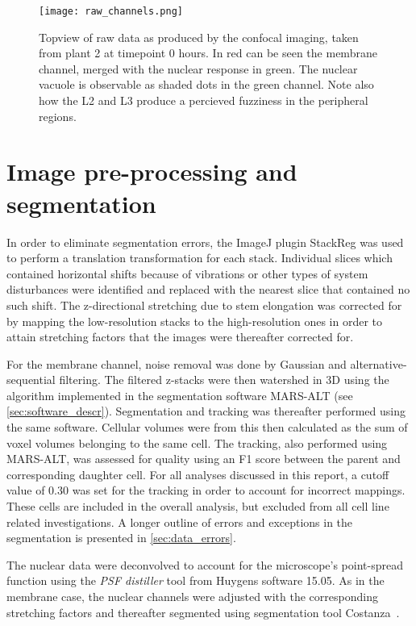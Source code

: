 \begin{figure}[H]
  \centering
  \texttt{[image: raw\_channels.png]}
  \caption[Confocal microscopy data]{Topview of raw data as produced by the
    confocal imaging, taken from plant 2 at timepoint 0 hours. In red can be
    seen the membrane channel, merged with the
    nuclear response in green. The nuclear vacuole is observable as shaded dots
    in the green channel. Note also how the L2 and L3 produce a percieved
    fuzziness in the peripheral regions.}
  \label{fig:rawdata}
\end{figure}

\section[Processed image data]{Image pre-processing and segmentation}
In order to eliminate segmentation errors, the ImageJ plugin StackReg was used
to perform a translation transformation for each stack. Individual slices which
contained horizontal shifts because of vibrations or other types of system
disturbances were identified and replaced with the nearest slice that contained
no such shift. The z-directional stretching due to stem elongation was corrected for by mapping
the low-resolution stacks to the high-resolution ones in order to attain
stretching factors that the images were thereafter corrected for. 

For the membrane channel, noise removal was done by Gaussian and alternative-sequential
filtering. The filtered z-stacks were then watershed in 3D using the
algorithm implemented in the segmentation software MARS-ALT (see
\cref{sec:software_descr}). Segmentation and
tracking was thereafter performed using the same software. Cellular volumes were from
this then calculated as the sum of voxel volumes belonging to the same cell.
The tracking, also performed using MARS-ALT, was assessed for quality using an F1
score between the parent and corresponding daughter cell. For all analyses
discussed in this report, a cutoff value of 0.30 was set for the tracking in
order to account for incorrect mappings. These cells are included in the
overall analysis, but excluded from all cell line related investigations.
A longer outline of errors and exceptions in the segmentation is presented in
\cref{sec:data_errors}.   

The nuclear data were deconvolved to account for the microscope's point-spread
function using the \textit{PSF distiller} tool from Huygens software 15.05. As
in the membrane case, the nuclear channels were adjusted with the  
corresponding stretching factors and thereafter segmented using segmentation
tool Costanza~\cite{costanza}. 

